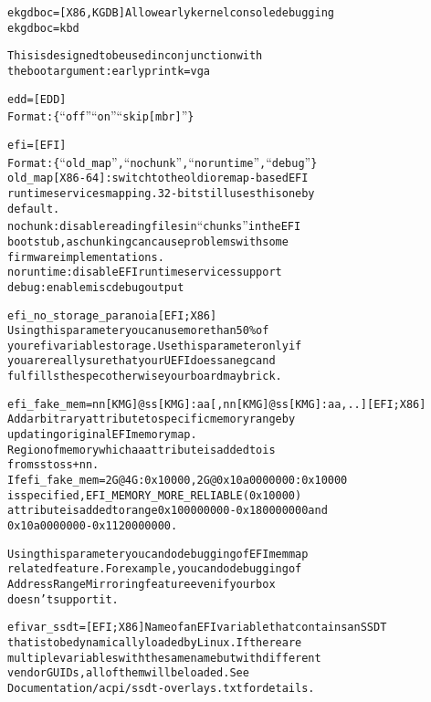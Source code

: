 \documentclass[a4paper,8pt,english]{sphinxmanual}
\begin{document}
\begin{alltt}
        ekgdboc=        {[}X86,KGDB{]} Allow early kernel console debugging
                        ekgdboc=kbd

                        This is designed to be used in conjunction with
                        the boot argument: earlyprintk=vga

        edd=            {[}EDD{]}
                        Format: \{``off'' \textbar{} ``on'' \textbar{} ``skip{[}mbr{]}''\}

        efi=            {[}EFI{]}
                        Format: \{ ``old\_map'', ``nochunk'', ``noruntime'', ``debug'' \}
                        old\_map {[}X86-64{]}: switch to the old ioremap-based EFI
                        runtime services mapping. 32-bit still uses this one by
                        default.
                        nochunk: disable reading files in ``chunks'' in the EFI
                        boot stub, as chunking can cause problems with some
                        firmware implementations.
                        noruntime : disable EFI runtime services support
                        debug: enable misc debug output

        efi\_no\_storage\_paranoia {[}EFI; X86{]}
                        Using this parameter you can use more than 50\% of
                        your efi variable storage. Use this parameter only if
                        you are really sure that your UEFI does sane gc and
                        fulfills the spec otherwise your board may brick.

        efi\_fake\_mem=   nn{[}KMG{]}@ss{[}KMG{]}:aa{[},nn{[}KMG{]}@ss{[}KMG{]}:aa,..{]} {[}EFI; X86{]}
                        Add arbitrary attribute to specific memory range by
                        updating original EFI memory map.
                        Region of memory which aa attribute is added to is
                        from ss to ss+nn.
                        If efi\_fake\_mem=2G@4G:0x10000,2G@0x10a0000000:0x10000
                        is specified, EFI\_MEMORY\_MORE\_RELIABLE(0x10000)
                        attribute is added to range 0x100000000-0x180000000 and
                        0x10a0000000-0x1120000000.

                        Using this parameter you can do debugging of EFI memmap
                        related feature. For example, you can do debugging of
                        Address Range Mirroring feature even if your box
                        doesn't support it.

        efivar\_ssdt=    {[}EFI; X86{]} Name of an EFI variable that contains an SSDT
                        that is to be dynamically loaded by Linux. If there are
                        multiple variables with the same name but with different
                        vendor GUIDs, all of them will be loaded. See
                        Documentation/acpi/ssdt-overlays.txt for details.



\end{alltt}
\end{document}
